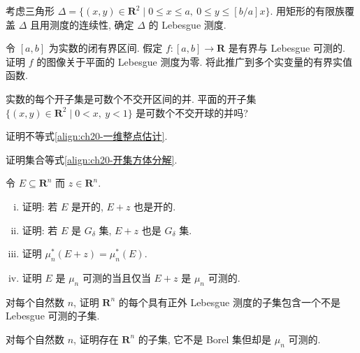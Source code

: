 \documentclass[../../main.tex]{subfiles}
\begin{document}
\begin{exercise}\label{exercise:ch20-15}
考虑三角形 $\Delta=\{(x,y)\in\mathbf{R}^{2}\mid 0\leqslant x\leqslant a,\ 0\leqslant y\leqslant[b/a]x\}$. 用矩形的有限族覆盖 $\Delta$ 且用测度的连续性, 确定 $\Delta$ 的 Lebesgue 测度.
\end{exercise}

\begin{exercise}\label{exercise:ch20-16}
令 $[a,b]$ 为实数的闭有界区间. 假定 $f:[a,b]\to\mathbf{R}$ 是有界与 Lebesgue 可测的. 证明 $f$ 的图像关于平面的 Lebesgue 测度为零. 将此推广到多个实变量的有界实值函数.
\end{exercise}

\begin{exercise}\label{exercise:ch20-17}
实数的每个开子集是可数个不交开区间的并. 平面的开子集 $\{(x,y)\in\mathbf{R}^{2}\mid 0<x,\ y<1\}$ 是可数个不交开球的并吗?
\end{exercise}

\begin{exercise}\label{exercise:ch20-18}
证明不等式\eqref{align:ch20-一维整点估计}.
\end{exercise}

\begin{exercise}\label{exercise:ch20-19}
证明集合等式\eqref{align:ch20-开集方体分解}.
\end{exercise}

\begin{exercise}\label{exercise:ch20-20}
令 $E\subseteq\mathbf{R}^{n}$ 而 $z\in\mathbf{R}^{n}$.
\begin{enumerate}[(i)]
\item 证明: 若 $E$ 是开的, $E+z$ 也是开的.
\item 证明: 若 $E$ 是 $G_{\delta}$ 集, $E+z$ 也是 $G_{\delta}$ 集.
\item 证明 $\mu_{n}^{*}(E+z)=\mu_{n}^{*}(E)$.
\item 证明 $E$ 是 $\mu_{n}$ 可测的当且仅当 $E+z$ 是 $\mu_{n}$ 可测的.
\end{enumerate}
\end{exercise}

\begin{exercise}\label{exercise:ch20-21}
对每个自然数 $n$, 证明 $\mathbf{R}^{n}$ 的每个具有正外 Lebesgue 测度的子集包含一个不是 Lebesgue 可测的子集.
\end{exercise}

\begin{exercise}\label{exercise:ch20-22}
对每个自然数 $n$, 证明存在 $\mathbf{R}^{n}$ 的子集, 它不是 Borel 集但却是 $\mu_{n}$ 可测的.
\end{exercise}
\end{document}
